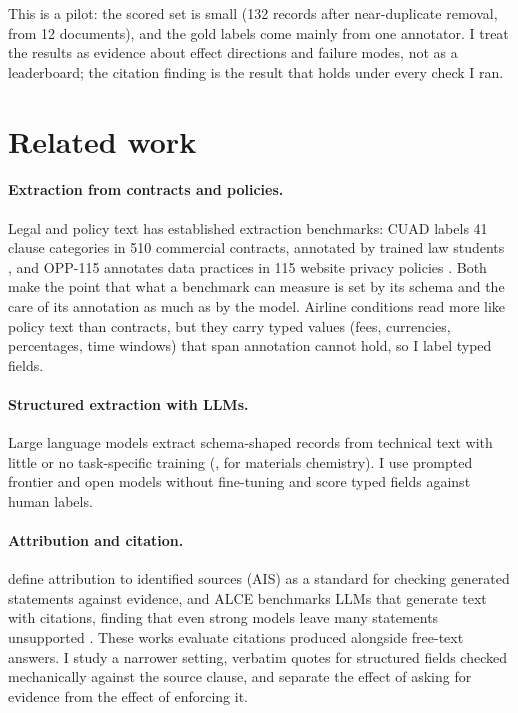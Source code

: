 \documentclass[11pt,a4paper]{article}
\begin{document}
This is a pilot: the scored set is small (132 records after near-duplicate removal, from 12 documents), and the gold labels come mainly from one annotator. I treat the results as evidence about effect directions and failure modes, not as a leaderboard; the citation finding is the result that holds under every check I ran.

\section{Related work}

\paragraph{Extraction from contracts and policies.} Legal and policy text has established extraction benchmarks: CUAD labels 41 clause categories in 510 commercial contracts, annotated by trained law students \citep{hendrycks2021cuad}, and OPP-115 annotates data practices in 115 website privacy policies \citep{wilson2016opp}. Both make the point that what a benchmark can measure is set by its schema and the care of its annotation as much as by the model. Airline conditions read more like policy text than contracts, but they carry typed values (fees, currencies, percentages, time windows) that span annotation cannot hold, so I label typed fields.

\paragraph{Structured extraction with LLMs.} Large language models extract schema-shaped records from technical text with little or no task-specific training (\citealp{dagdelen2024structured}, for materials chemistry). I use prompted frontier and open models without fine-tuning and score typed fields against human labels.

\paragraph{Attribution and citation.} \citet{rashkin2023ais} define attribution to identified sources (AIS) as a standard for checking generated statements against evidence, and ALCE benchmarks LLMs that generate text with citations, finding that even strong models leave many statements unsupported \citep{gao2023alce}. These works evaluate citations produced alongside free-text answers. I study a narrower setting, verbatim quotes for structured fields checked mechanically against the source clause, and separate the effect of asking for evidence from the effect of enforcing it.
\end{document}

